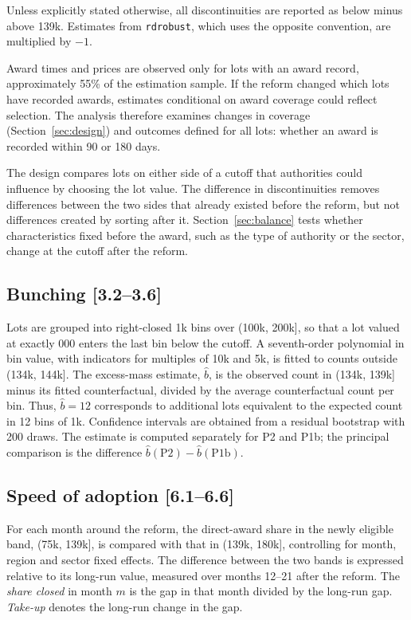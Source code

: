 \documentclass[11pt,a4paper]{article}
\newcommand{\code}[1]{\texttt{\small #1}}
\newcommand{\sect}[1]{\textsf{\small [#1]}}
\begin{document}
Unless explicitly stated otherwise, all discontinuities are reported as below minus above \texteuro139k. Estimates from \code{rdrobust}, which uses the opposite convention, are multiplied by $-1$.

Award times and prices are observed only for lots with an award record, approximately 55\% of the estimation sample. If the reform changed which lots have recorded awards, estimates conditional on award coverage could reflect selection. The analysis therefore examines changes in coverage (Section~\ref{sec:design}) and outcomes defined for all lots: whether an award is recorded within 90 or 180 days.

The design compares lots on either side of a cutoff that authorities could influence by choosing the lot value. The difference in discontinuities removes differences between the two sides that already existed before the reform, but not differences created by sorting after it. Section~\ref{sec:balance} tests whether characteristics fixed before the award, such as the type of authority or the sector, change at the cutoff after the reform.

\subsection{Bunching \sect{3.2--3.6}}

Lots are grouped into right-closed \texteuro1k bins over (\texteuro100k, \texteuro200k], so that a lot valued at exactly 000 enters the last bin below the cutoff. A seventh-order polynomial in bin value, with indicators for multiples of \texteuro10k and \texteuro5k, is fitted to counts outside (\texteuro134k, \texteuro144k]. The excess-mass estimate, $\hat b$, is the observed count in (\texteuro134k, \texteuro139k] minus its fitted counterfactual, divided by the average counterfactual count per bin. Thus, $\hat b = 12$ corresponds to additional lots equivalent to the expected count in 12 bins of \texteuro1k. Confidence intervals are obtained from a residual bootstrap with 200 draws. The estimate is computed separately for P2 and P1b; the principal comparison is the difference $\hat b(\text{P2}) - \hat b(\text{P1b})$.

\subsection{Speed of adoption \sect{6.1--6.6}}

For each month around the reform, the direct-award share in the newly eligible band, (\texteuro75k, \texteuro139k], is compared with that in (\texteuro139k, \texteuro180k], controlling for month, region and sector fixed effects. The difference between the two bands is expressed relative to its long-run value, measured over months 12--21 after the reform. The \emph{share closed} in month $m$ is the gap in that month divided by the long-run gap. \emph{Take-up} denotes the long-run change in the gap.
\end{document}

